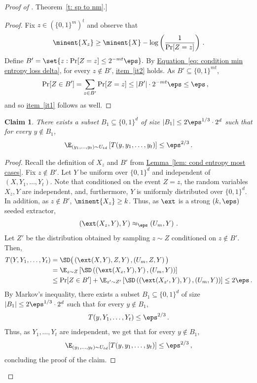 \documentclass[11pt]{article}
\numberwithin{equation}{section}
\newtheorem{claim}[theorem]{Claim}
\theoremstyle{definition}
\theoremstyle{plain}
\newcommand{\expref}[2]{\hyperref[#2]{#1~\ref{#2}}}
\newcommand{\expeqref}[2]{\hyperref[#2]{#1~\eqref{#2}}}
\begin{document}
\begin{proof}[Proof of \expref{Theorem}{t: sp to nm}.]
\begin{proof}
%
	
	Fix $z\in (\{0,1\}^m)^t$ and observe that  
	\begin{equation}\label{eq: condition min entropy loss delta}
		\minent{ X_{z}} \geq \minent{X} - \log\left(\frac{1}{\Pr[Z = z]}\right)\,.
	\end{equation}
	Define
	$
	B' = \set{z : \Pr[Z = z] \le 2^{-mt}  \eps}.
	$
	By \expeqref{Equation}{eq: condition min entropy loss delta}, for every $z \notin B'$, \expeqref{item}{it2} holds.
 	As $B' \subseteq \{0,1\}^{mt}$,
\begin{align*}
	\Pr[Z\in B'] &= \sum_{z \in B'}\Pr[Z = z] 
	\leq |B'| \cdot 2^{-mt}  \eps \le \eps\,,
\end{align*}
and so \expeqref{item}{it1} follows as well.
\end{proof}

\begin{claim}\label{claim:average behavior}
There exists a subset $B_1 \subseteq \{0,1\}^d$ of size $|B_1| \le 2\eps^{1/3} \cdot 2^d$ such that for every $y \notin B_1$,
\[
\E_{(y_1,\ldots,y_t) \sim U_{td}}\left[T(y,y_1,\ldots,y_t)\right] \le \eps^{2/3}\,.
\]
\end{claim}

\begin{proof}
Recall the definition of $X_{z}$ and $B'$ from \expref{Lemma}{lem: cond entropy most cases}. 
Fix $z \not\in B'$. Let $Y$ be uniform over $\{0,1\}^d$ and independent of $(X,Y_1,\ldots, Y_t)$. Note that conditioned on the event $Z = z$, the random variables $X_{z}, Y$ are independent, and, furthermore, $Y$ is uniformly distributed over $\{0,1\}^d$. In addition, as $z \not\in B'$, $\minent{X_{z}} \ge k$. Thus, as $\ext$ is a strong $(k,\eps)$ seeded extractor,
\[
\left( \ext(X_{z},Y), Y \right) \approx_\eps \left( U_m, Y \right)\,.
\]
Let $Z'$ be the distribution obtained by sampling $z \sim Z$ conditioned on $z \notin B'$. Then,
\begin{align*}
T(Y,Y_1,\ldots,Y_t) &= \SD\big( \left(\ext(X,Y), Z , Y \right),  \left(U_m, Z, Y\right) \big) \\
&= \E_{z \sim Z} \left[ \SD\left( \left(\ext(X_{z},Y), Y \right),
          \left(U_m, Y \right)
   \right) \right] \\
&\le \Pr[Z \in B'] + \E_{z' \sim Z'}\left[ \SD\left( \left(\ext(X_{z'},Y), Y \right),
          \left(U_m, Y \right)
   \right) \right] \le 2\eps\,.
\end{align*}
By Markov's inequality, there exists a subset $B_1 \subseteq \{0,1\}^d$ of size $|B_1| \le 2\eps^{1/3} \cdot 2^d$ such that for every $y \notin B_1$,
\[
T(y,Y_1,\ldots,Y_t) \leq \eps^{2/3}\,.
\]
Thus, as $Y_1,\ldots, Y_t$ are independent, we get that for every $y \notin B_1$,
\[
\E_{(y_1,\ldots,y_t) \sim U_{td}}[T(y,y_1,\ldots,y_t)] \le \eps^{2/3}\,,
\]
concluding the proof of the claim.
\end{proof}


\end{proof}
\end{document}
